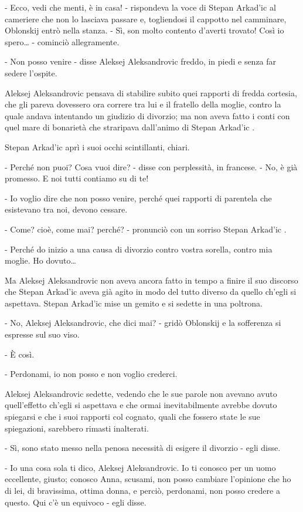 - Ecco, vedi che menti, è in casa! - rispondeva la voce di Stepan Arkad'ic al cameriere che non lo lasciava passare e, togliendosi il cappotto nel camminare, Oblonskij entrò nella stanza. - Sì, son molto contento d'averti trovato! Così io spero\ldots{} - cominciò allegramente. 

- Non posso venire - disse Aleksej Aleksandrovic freddo, in piedi e senza far sedere l'ospite. 

Aleksej Aleksandrovic pensava di stabilire subito quei rapporti di fredda cortesia, che gli pareva dovessero ora correre tra lui e il fratello della moglie, contro la quale andava intentando un giudizio di divorzio; ma non aveva fatto i conti con quel mare di bonarietà che straripava dall'animo di Stepan Arkad'ic . 

Stepan Arkad'ic aprì i suoi occhi scintillanti, chiari. 

- Perché non puoi? Cosa vuoi dire? - disse con perplessità, in francese. - No, è già promesso. E noi tutti contiamo su di te! 

- Io voglio dire che non posso venire, perché quei rapporti di parentela che esistevano tra noi, devono cessare. 

- Come? cioè, come mai? perché? - pronunciò con un sorriso Stepan Arkad'ic . 

- Perché do inizio a una causa di divorzio contro vostra sorella, contro mia moglie. Ho dovuto\ldots{} 

Ma Aleksej Aleksandrovic non aveva ancora fatto in tempo a finire il suo discorso che Stepan Arkad'ic aveva già agito in modo del tutto diverso da quello ch'egli si aspettava. Stepan Arkad'ic mise un gemito e si sedette in una poltrona. 

- No, Aleksej Aleksandrovic, che dici mai? - gridò Oblonskij e la sofferenza si espresse sul suo viso. 

- È così. 

- Perdonami, io non posso e non voglio crederci. 

Aleksej Aleksandrovic sedette, vedendo che le sue parole non avevano avuto quell'effetto ch'egli si aspettava e che ormai inevitabilmente avrebbe dovuto spiegarsi e che i suoi rapporti col cognato, quali che fossero state le sue spiegazioni, sarebbero rimasti inalterati. 

- Sì, sono stato messo nella penosa necessità di esigere il divorzio - egli disse. 

- Io una cosa sola ti dico, Aleksej Aleksandrovic. Io ti conosco per un uomo eccellente, giusto; conosco Anna, scusami, non posso cambiare l'opinione che ho di lei, di bravissima, ottima donna, e perciò, perdonami, non posso credere a questo. Qui c'è un equivoco - egli disse. 

